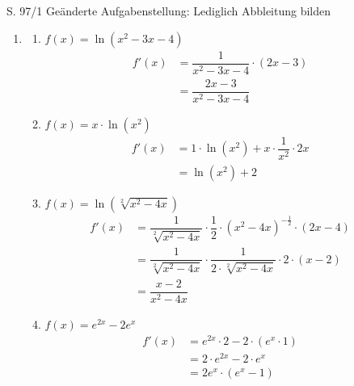 \begin{Exercise}{S. 97/1}{}
Geänderte Aufgabenstellung: Lediglich Abbleitung bilden\\[-2.0ex]
\begin{enumerate}
    \item [1.]\begin{enumerate}[label=\alph*)]
        \item[b)] {
            $f(x) = \ln\left(x^{2} -3x -4\right)$\\[-2.0ex]
            \begin{align*}
                f'(x) &= \dfrac{1}{x^{2} -3x -4} \cdot \left(2x -3\right) &&\\[2.0ex]
                &= \dfrac{2x -3}{x^{2} -3x -4} &&
            \end{align*}
            }
        \item[c)] {
            $f(x) = x \cdot \ln\left(x^{2}\right)$\\[-2.0ex]
            \begin{align*}
                f'(x) &= 1 \cdot \ln\left(x^{2}\right) + x \cdot \dfrac{1}{x^{2}} \cdot 2x &&\\[1.5ex]
                &= \ln\left(x^{2}\right) + 2 &&
            \end{align*}
            }
        \item[d)] {
            $f(x) = \ln\left(\sqrt[2]{x^{2} -4x}\right)$\\[-2.0ex]
            \begin{align*}
                f'(x) &= \dfrac{1}{\sqrt[2]{x^{2} -4x}} \cdot \dfrac{1}{2} \cdot \left(x^{2} -4x\right)^{-\frac{1}{2}} \cdot \left(2x -4\right) &&\\[1.5ex]
                &= \dfrac{1}{\sqrt[2]{x^{2} -4x}} \cdot \dfrac{1}{2 \cdot \sqrt[2]{x^{2} -4x}} \cdot 2 \cdot \left(x -2\right) &&\\[1.5ex]
                &= \dfrac{x-2}{x^{2} -4x} &&
            \end{align*}
            }
        \item[e)] {
            $f(x) = e^{2x} - 2e^{x}$\\[-2.0ex]
            \begin{align*}
                f'(x) &= e^{2x} \cdot 2 - 2 \cdot \left(e^{x} \cdot 1\right)\\[1.5ex]
                &= 2 \cdot e^{2x} - 2 \cdot e^{x} &&\\[1.5ex]
                &= 2 e^{x} \cdot \left(e^{x} - 1\right) &&
            \end{align*}
}
\end{enumerate}
\end{enumerate}
\end{Exercise}

